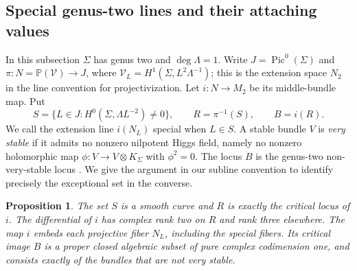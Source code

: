 \documentclass[11pt]{amsart}
\newtheorem{proposition}[theorem]{Proposition}
\theoremstyle{definition}
\theoremstyle{remark}
\theoremstyle{plain}
\newcommand{\PP}{\mathbb{P}}
\begin{document}
\subsection{Special genus-two lines and their attaching values}
\label{sec:special-genus-two-lines}
In this subsection $\Sigma$ has genus two and $\deg\Lambda=1$.
Write $J=\operatorname{Pic}^0(\Sigma)$ and
$\pi:N=\PP(\mathcal V)\to J$, where
$\mathcal V_L=H^1(\Sigma,L^2\Lambda^{-1})$; this is the extension
space $N_2$ in the line convention for projectivization.
Let $i:N\to M_2$ be its middle-bundle map. Put
\begin{equation}\label{eq:genus-two-exceptional-loci}
 S=\{L\in J:H^0(\Sigma,\Lambda L^{-2})\ne0\},\qquad
 R=\pi^{-1}(S),\qquad B=i(R).
\end{equation}
We call the extension line $i(N_L)$ special when $L\in S$.
A stable bundle $V$ is \emph{very stable} if it admits no nonzero
nilpotent Higgs field, namely no nonzero holomorphic map
$\phi:V\to V\otimes K_\Sigma$ with $\phi^2=0$.
The locus $B$ is the genus-two non-very-stable locus
\cite[Section~2 of the preprint]{PalPauly21}.
We give the argument in our subline convention to identify precisely
the exceptional set in the converse.

\begin{proposition}\label{prop:genus-two-exceptional}
The set $S$ is a smooth curve and $R$ is exactly the critical locus
of $i$. The differential of $i$ has complex rank two on $R$ and
rank three elsewhere. The map $i$ embeds each projective fiber
$N_L$, including the special fibers. Its critical image $B$ is a
proper closed algebraic subset of pure complex codimension one,
and consists exactly of the bundles that are not very stable.
\end{proposition}
\end{document}
